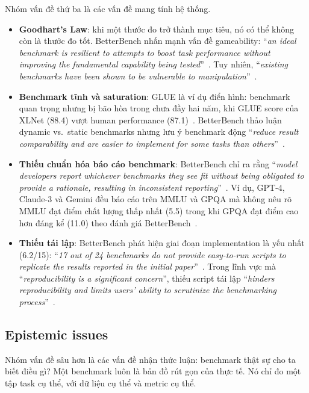 Nhóm vấn đề thứ ba là các vấn đề mang tính hệ thống.

\begin{itemize}
    \item \textbf{Goodhart's Law}: khi một thước đo trở thành mục tiêu, nó có thể không còn là thước đo tốt. BetterBench nhấn mạnh vấn đề gameability: ``\textit{an ideal benchmark is resilient to attempts to boost task performance without improving the fundamental capability being tested}''~\cite{betterbench}. Tuy nhiên, ``\textit{existing benchmarks have been shown to be vulnerable to manipulation}''~\cite{betterbench}.

    \item \textbf{Benchmark tĩnh và saturation}: GLUE là ví dụ điển hình: benchmark quan trọng nhưng bị bão hòa trong chưa đầy hai năm, khi GLUE score của XLNet (88.4) vượt human performance (87.1)~\cite{superglue}. BetterBench thảo luận dynamic vs.\ static benchmarks nhưng lưu ý benchmark động ``\textit{reduce result comparability and are easier to implement for some tasks than others}''~\cite{betterbench}.

    \item \textbf{Thiếu chuẩn hóa báo cáo benchmark}: BetterBench chỉ ra rằng ``\textit{model developers report whichever benchmarks they see fit without being obligated to provide a rationale, resulting in inconsistent reporting}''~\cite{betterbench}. Ví dụ, GPT-4, Claude-3 và Gemini đều báo cáo trên MMLU và GPQA mà không nêu rõ MMLU đạt điểm chất lượng thấp nhất (5.5) trong khi GPQA đạt điểm cao hơn đáng kể (11.0) theo đánh giá BetterBench~\cite{betterbench}.

    \item \textbf{Thiếu tái lập}: BetterBench phát hiện giai đoạn implementation là yếu nhất (6.2/15): ``\textit{17 out of 24 benchmarks do not provide easy-to-run scripts to replicate the results reported in the initial paper}''~\cite{betterbench}. Trong lĩnh vực mà ``\textit{reproducibility is a significant concern}'', thiếu script tái lập ``\textit{hinders reproducibility and limits users' ability to scrutinize the benchmarking process}''~\cite{betterbench}.
\end{itemize}

\subsection{Epistemic issues}

Nhóm vấn đề sâu hơn là các vấn đề nhận thức luận: benchmark thật sự cho ta biết điều gì? Một benchmark luôn là bản đồ rút gọn của thực tế. Nó chỉ đo một tập task cụ thể, với dữ liệu cụ thể và metric cụ thể.


